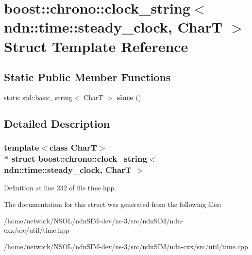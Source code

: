\hypertarget{structboost_1_1chrono_1_1clock__string_3_01ndn_1_1time_1_1steady__clock_00_01CharT_01_4}{}\section{boost\+:\+:chrono\+:\+:clock\+\_\+string$<$ ndn\+:\+:time\+:\+:steady\+\_\+clock, CharT $>$ Struct Template Reference}
\label{structboost_1_1chrono_1_1clock__string_3_01ndn_1_1time_1_1steady__clock_00_01CharT_01_4}
\subsection*{Static Public Member Functions}
\begin{DoxyCompactItemize}
\item 
static std\+::basic\+\_\+string$<$ CharT $>$ {\bfseries since} ()\hypertarget{structboost_1_1chrono_1_1clock__string_3_01ndn_1_1time_1_1steady__clock_00_01CharT_01_4_aa8051af96884835d817bd19fc9f608c9}{}\label{structboost_1_1chrono_1_1clock__string_3_01ndn_1_1time_1_1steady__clock_00_01CharT_01_4_aa8051af96884835d817bd19fc9f608c9}

\end{DoxyCompactItemize}


\subsection{Detailed Description}
\subsubsection*{template$<$class CharT$>$\\*
struct boost\+::chrono\+::clock\+\_\+string$<$ ndn\+::time\+::steady\+\_\+clock, Char\+T $>$}



Definition at line 232 of file time.\+hpp.



The documentation for this struct was generated from the following files\+:\begin{DoxyCompactItemize}
\item 
/home/network/\+N\+S\+O\+L/ndn\+S\+I\+M-\/dev/ns-\/3/src/ndn\+S\+I\+M/ndn-\/cxx/src/util/time.\+hpp\item 
/home/network/\+N\+S\+O\+L/ndn\+S\+I\+M-\/dev/ns-\/3/src/ndn\+S\+I\+M/ndn-\/cxx/src/util/time.\+cpp\end{DoxyCompactItemize}
